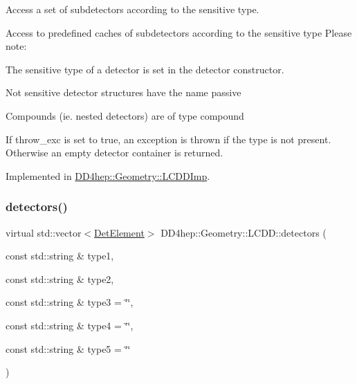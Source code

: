 Access a set of subdetectors according to the sensitive type. 

Access to predefined caches of subdetectors according to the sensitive type Please note\+:
\begin{DoxyItemize}
\item The sensitive type of a detector is set in the \textquotesingle{}detector constructor\textquotesingle{}.
\item Not sensitive detector structures have the name \textquotesingle{}passive\textquotesingle{}
\item Compounds (ie. nested detectors) are of type \textquotesingle{}compound\textquotesingle{}
\item If throw\+\_\+exc is set to true, an exception is thrown if the type is not present. Otherwise an empty detector container is returned. 
\end{DoxyItemize}

Implemented in \hyperlink{class_d_d4hep_1_1_geometry_1_1_l_c_d_d_imp_afbdc8547ce8343cdff56430acff2baeb}{D\+D4hep\+::\+Geometry\+::\+L\+C\+D\+D\+Imp}.

\hypertarget{class_d_d4hep_1_1_geometry_1_1_l_c_d_d_aee911f853a0e585f0ac9be7852ed6954}{}\label{class_d_d4hep_1_1_geometry_1_1_l_c_d_d_aee911f853a0e585f0ac9be7852ed6954} 
\subsubsection{\texorpdfstring{detectors()}{detectors()}\hspace{0.1cm}{\footnotesize\ttfamily [3/4]}}
{\footnotesize\ttfamily virtual std\+::vector$<$\hyperlink{class_d_d4hep_1_1_geometry_1_1_det_element}{Det\+Element}$>$ D\+D4hep\+::\+Geometry\+::\+L\+C\+D\+D\+::detectors (\begin{DoxyParamCaption}\item[{const std\+::string \&}]{type1,  }\item[{const std\+::string \&}]{type2,  }\item[{const std\+::string \&}]{type3 = {\ttfamily \char`\"{}\char`\"{}},  }\item[{const std\+::string \&}]{type4 = {\ttfamily \char`\"{}\char`\"{}},  }\item[{const std\+::string \&}]{type5 = {\ttfamily \char`\"{}\char`\"{}} }\end{DoxyParamCaption})\hspace{0.3cm}{\ttfamily [pure virtual]}}



